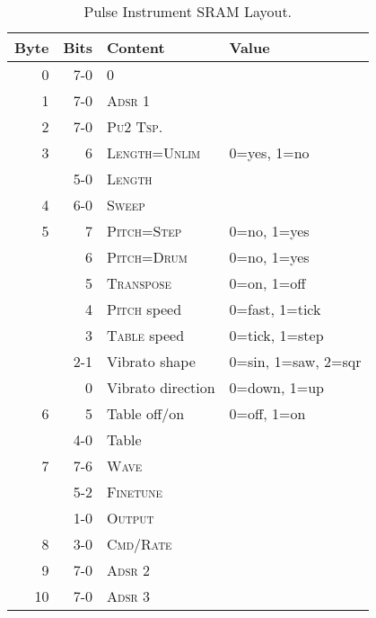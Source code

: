 \begin{table}
	\begin{center}
	\caption{Pulse Instrument SRAM Layout.}
	\label{tab:sram-pulse}
	\begin{tabular}{r|r|l|l}
		\toprule
    Byte & Bits & Content & Value \\
    \midrule
    0  & 7-0 & 0 & \\
    1  & 7-0 & \textsc{Adsr 1} 		& \\
    2  & 7-0 & \textsc{Pu2 Tsp.} 	& \\
    3  & 6   & \textsc{Length=Unlim} 	& 0=yes, 1=no \\
       & 5-0 & \textsc{Length} 		& \\
    4  & 6-0 & \textsc{Sweep} 		& \\
    5  & 7   & \textsc{Pitch=Step} 	& 0=no, 1=yes \\
       & 6   & \textsc{Pitch=Drum} 	& 0=no, 1=yes \\
       & 5   & \textsc{Transpose} 	& 0=on, 1=off \\
       & 4   & \textsc{Pitch} speed	& 0=fast, 1=tick \\
       & 3   & \textsc{Table} speed	& 0=tick, 1=step \\
       & 2-1 & Vibrato shape		& 0=sin, 1=saw, 2=sqr \\
       & 0   & Vibrato direction	& 0=down, 1=up \\
    6  & 5   & Table off/on		& 0=off, 1=on \\
       & 4-0 & Table			& \\
    7  & 7-6 & \textsc{Wave}		& \\
       & 5-2 & \textsc{Finetune}	& \\
       & 1-0 & \textsc{Output}		& \\
    8  & 3-0 & \textsc{Cmd/Rate}	& \\
    9  & 7-0 & \textsc{Adsr 2}		& \\
    10 & 7-0 & \textsc{Adsr 3}		& \\
    \bottomrule
	\end{tabular}
	\end{center}
\end{table}

